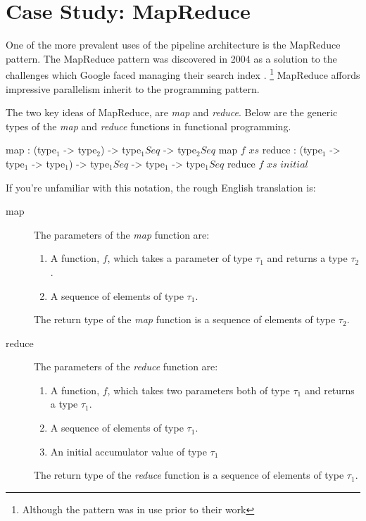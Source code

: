 \documentclass{csse4400}
\begin{document}
\section{Case Study: MapReduce}

One of the more prevalent uses of the pipeline architecture is the MapReduce pattern.
The MapReduce pattern was discovered in 2004 as a solution to the challenges which Google faced managing their search index \cite{mapreduce}.%
\footnote{Although the pattern was in use prior to their work\cite{mapreduce-critique}} %
MapReduce affords impressive parallelism inherit to the programming pattern.

The two key ideas of MapReduce, are \textsl{map} and \textsl{reduce}.
Below are the generic types of the \textsl{map} and \textsl{reduce} functions in functional programming.

\begin{code}[language=lambda]{}
map : (type$_1$ -> type$_2$) -> type$_1 Seq$ -> type$_2 Seq$
map $f$ $xs$
reduce : (type$_1$ -> type$_1$ -> type$_1$) -> type$_1 Seq$ -> type$_1$ -> type$_1 Seq$
reduce $f$ $xs$ $initial$
\end{code}

If you're unfamiliar with this notation, the rough English translation is:
\begin{description}
    \item[map] The parameters of the \textsl{map} function are:
        \begin{enumerate}[label=(\alph*)]
            \item A function, $f$, which takes a parameter of type $\tau_1$ and returns a type $\tau_2$.
            \item A sequence of elements of type $\tau_1$.
        \end{enumerate}
        The return type of the \textsl{map} function is a sequence of elements of type $\tau_2$.
    \item[reduce] The parameters of the \textsl{reduce} function are:
        \begin{enumerate}[label=(\alph*)]
            \item A function, $f$, which takes two parameters both of type $\tau_1$ and returns a type $\tau_1$.
            \item A sequence of elements of type $\tau_1$.
            \item An initial accumulator value of type $\tau_1$
        \end{enumerate}
        The return type of the \textsl{reduce} function is a sequence of elements of type $\tau_1$.
\end{description}
\end{document}
